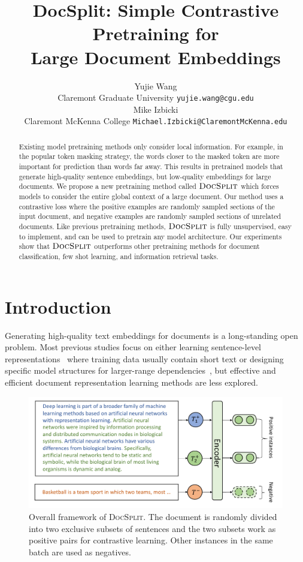 \documentclass[11pt]{article}
\title{DocSplit: Simple Contrastive Pretraining for \\ Large Document Embeddings}
\author{Yujie Wang \\
  Claremont Graduate University 
  \texttt{yujie.wang@cgu.edu} \\\And
  Mike Izbicki \\
  Claremont McKenna College
  \texttt{Michael.Izbicki@ClaremontMcKenna.edu} \\}
\newcommand{\our}{\mbox{\textsc{DocSplit}}}
\begin{document}
\maketitle
\begin{abstract}

Existing model pretraining methods only consider local information.
For example, in the popular token masking strategy, the words closer to the masked token are more important for prediction than words far away.
This results in pretrained models that generate high-quality sentence embeddings, but low-quality embeddings for large documents.
We propose a new pretraining method called $\our$ which forces models to consider the entire global context of a large document.
Our method uses a contrastive loss where the positive examples are randomly sampled sections of the input document, and negative examples are randomly sampled sections of unrelated documents.
Like previous pretraining methods, $\our$ is fully unsupervised, easy to implement, and can be used to pretrain any model
architecture.
Our experiments show that $\our$ outperforms other pretraining methods for document classification, few shot learning, and information retrieval tasks.
\end{abstract}



\section{Introduction}

Generating high-quality text embeddings for documents is a long-standing open problem.
Most previous studies focus on either learning sentence-level representations~\cite{Hill2016LearningDR, Logeswaran2018AnEF, Gao2021SimCSESC} where training data usually contain short text or designing specific model structures for larger-range dependencies~\cite{Beltagy2020LongformerTL, Zaheer2020BigBT},
but effective and efficient document representation learning methods are less explored.

\begin{figure}[h]
\includegraphics[width=\columnwidth]{fig/docsplit.pdf}
\caption{Overall framework of \our. The document is randomly divided into two exclusive subsets of sentences and the two subsets work as positive pairs for contrastive learning. Other instances in the same batch are used as negatives.
}
\label{overall}
\end{figure}
\end{document}
